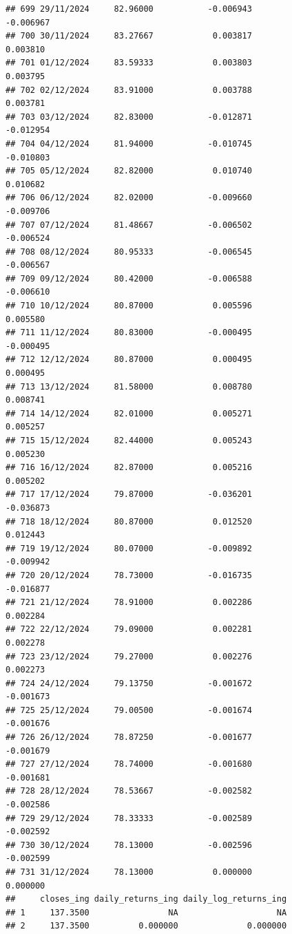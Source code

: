 \documentclass[
]{article}
\begin{document}
\begin{verbatim}
## 699 29/11/2024     82.96000           -0.006943               -0.006967
## 700 30/11/2024     83.27667            0.003817                0.003810
## 701 01/12/2024     83.59333            0.003803                0.003795
## 702 02/12/2024     83.91000            0.003788                0.003781
## 703 03/12/2024     82.83000           -0.012871               -0.012954
## 704 04/12/2024     81.94000           -0.010745               -0.010803
## 705 05/12/2024     82.82000            0.010740                0.010682
## 706 06/12/2024     82.02000           -0.009660               -0.009706
## 707 07/12/2024     81.48667           -0.006502               -0.006524
## 708 08/12/2024     80.95333           -0.006545               -0.006567
## 709 09/12/2024     80.42000           -0.006588               -0.006610
## 710 10/12/2024     80.87000            0.005596                0.005580
## 711 11/12/2024     80.83000           -0.000495               -0.000495
## 712 12/12/2024     80.87000            0.000495                0.000495
## 713 13/12/2024     81.58000            0.008780                0.008741
## 714 14/12/2024     82.01000            0.005271                0.005257
## 715 15/12/2024     82.44000            0.005243                0.005230
## 716 16/12/2024     82.87000            0.005216                0.005202
## 717 17/12/2024     79.87000           -0.036201               -0.036873
## 718 18/12/2024     80.87000            0.012520                0.012443
## 719 19/12/2024     80.07000           -0.009892               -0.009942
## 720 20/12/2024     78.73000           -0.016735               -0.016877
## 721 21/12/2024     78.91000            0.002286                0.002284
## 722 22/12/2024     79.09000            0.002281                0.002278
## 723 23/12/2024     79.27000            0.002276                0.002273
## 724 24/12/2024     79.13750           -0.001672               -0.001673
## 725 25/12/2024     79.00500           -0.001674               -0.001676
## 726 26/12/2024     78.87250           -0.001677               -0.001679
## 727 27/12/2024     78.74000           -0.001680               -0.001681
## 728 28/12/2024     78.53667           -0.002582               -0.002586
## 729 29/12/2024     78.33333           -0.002589               -0.002592
## 730 30/12/2024     78.13000           -0.002596               -0.002599
## 731 31/12/2024     78.13000            0.000000                0.000000
##     closes_ing daily_returns_ing daily_log_returns_ing
## 1     137.3500                NA                    NA
## 2     137.3500          0.000000              0.000000

\end{verbatim}
\end{document}
